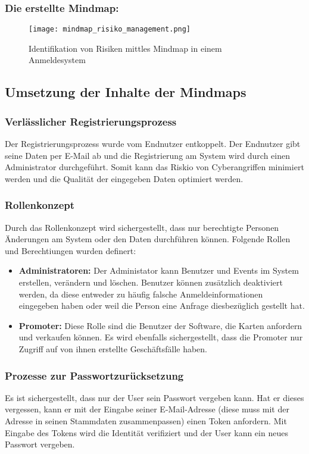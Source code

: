 \subsubsection{Die erstellte Mindmap:}
\begin{center}
\begin{figure}[H]
    \centering
    \texttt{[image: mindmap\_risiko\_management.png]}
    \caption{Identifikation von Risiken mittles Mindmap in einem Anmeldesystem}
\end{figure}
\end{center}
\subsection{Umsetzung der Inhalte der Mindmaps}
\subsubsection{Verlässlicher Registrierungsprozess}
Der Registrierungsprozess wurde vom Endnutzer entkoppelt. Der Endnutzer gibt seine Daten per E-Mail ab und die Registrierung am System wird durch einen Administrator durchgeführt. Somit kann das Riskio von Cyberangriffen minimiert werden und die Qualität der eingegeben Daten optimiert werden.
\subsubsection{Rollenkonzept}
Durch das Rollenkonzept wird sichergestellt, dass nur berechtigte Personen Änderungen am System oder den Daten durchführen können. Folgende Rollen und Berechtiungen wurden definert: 
\begin{itemize}
	\item \textbf{Administratoren:} Der Administator kann Benutzer und Events im System erstellen, verändern und löschen. Benutzer können zusätzlich deaktiviert werden, da diese entweder zu häufig falsche Anmeldeinformationen eingegeben haben oder weil die Person eine Anfrage diesbezüglich gestellt hat.
	\item \textbf{Promoter:} Diese Rolle sind die Benutzer der Software, die Karten anfordern und verkaufen können. Es wird ebenfalls sichergestellt, dass die Promoter nur Zugriff auf von ihnen erstellte Geschäftsfälle haben.
\end{itemize}

\subsubsection{Prozesse zur Passwortzurücksetzung}
Es ist sichergestellt, dass nur der User sein Passwort vergeben kann. Hat er dieses vergessen, kann er mit der Eingabe seiner E-Mail-Adresse (diese muss mit der Adresse in seinen Stammdaten zusammenpassen) einen Token anfordern. Mit Eingabe des Tokens wird die Identität verifiziert und der User kann ein neues Passwort vergeben.
